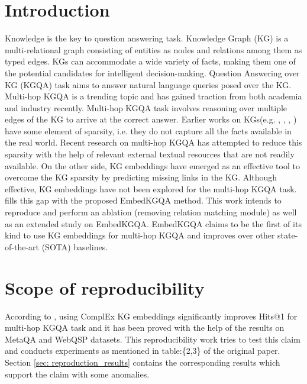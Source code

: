\section{Introduction}

Knowledge is the key to question answering task. Knowledge Graph (KG) is a multi-relational
graph consisting of entities as nodes and relations among them as typed edges. KGs can accommodate a wide variety of facts, making them one of the potential candidates for intelligent decision-making. Question Answering over KG (KGQA) task aims to answer natural language queries posed over the KG. Multi-hop KGQA is a trending topic and has gained traction from both academia and industry recently. Multi-hop KGQA task involves reasoning over multiple edges of the KG to arrive at the correct answer. Earlier works on KGs(e.g. \cite{yago}, \cite{freebase:datadumps}, \cite{dbpedia2015}, \cite{NELL}) have some element of sparsity, i.e. they do not capture all the facts available in the real world. Recent research on multi-hop KGQA has attempted to reduce this sparsity with the help of relevant external textual resources that are not readily available. On the other side, KG embeddings have emerged as an effective tool to overcome the KG sparsity by predicting missing links in the KG. Although effective, KG embeddings have not been explored for the multi-hop KGQA task. \cite{saxena-etal-2020-improving} fills this gap with the proposed EmbedKGQA method. This work intends to reproduce and perform an ablation (removing relation matching module) as well as an extended study on EmbedKGQA\cite{saxena-etal-2020-improving}. EmbedKGQA claims to be the first of its kind to use KG embeddings for multi-hop KGQA and improves over other state-of-the-art (SOTA) baselines.

\section{Scope of reproducibility}
\label{sec:claims}

According to \cite{saxena-etal-2020-improving}, using ComplEx \cite{ComplEx2016} KG embeddings significantly improves Hits@1 for multi-hop KGQA task and it has been proved with the help of the results on MetaQA \cite{metaqa-dataset} and WebQSP \cite{webqsp-dataset} datasets. This reproducibility work tries to test this claim and conducts experiments as mentioned in table:\{2,3\} of the original paper. Section \ref{sec: reproduction_results} contains the corresponding results which support the claim with some anomalies.

